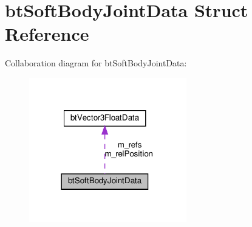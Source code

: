 \hypertarget{structbtSoftBodyJointData}{}\section{bt\+Soft\+Body\+Joint\+Data Struct Reference}
\label{structbtSoftBodyJointData}


Collaboration diagram for bt\+Soft\+Body\+Joint\+Data\+:
\nopagebreak
\begin{figure}[H]
\begin{center}
\leavevmode
\includegraphics[width=194pt]{structbtSoftBodyJointData__coll__graph}
\end{center}
\end{figure}
